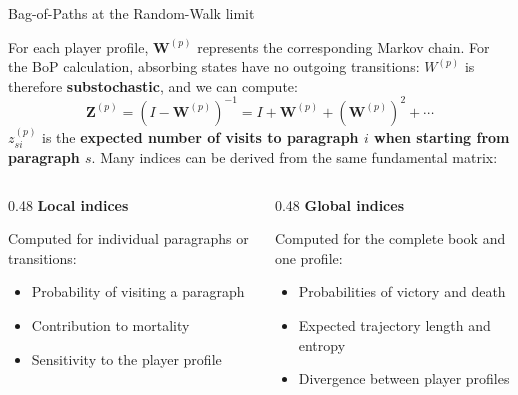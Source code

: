 \documentclass{beamer}
\newcommand{\imp}[1]{\textbf{\color{cyan}#1}}
\begin{document}
	\begin{frame}{Bag-of-Paths at the Random-Walk limit}
		
		\footnotesize
		
		For each player profile, $\mathbf{W}^{(p)}$ represents the corresponding Markov
		chain. For the BoP calculation, absorbing states have no outgoing
		transitions: $W^{(p)}$ is therefore \imp{substochastic}, and we can compute: 
		$$
		\boxed{
			\mathbf{Z}^{(p)}
			=
			\left(I-\mathbf{W}^{(p)}\right)^{-1}
			=
			I+\mathbf{W}^{(p)}+\left(\mathbf{W}^{(p)}\right)^2+\cdots
		}
		$$
		$z^{(p)}_{si}$ is the \imp{expected number of visits to paragraph $i$
		when starting from paragraph $s$}. Many indices can be derived from the same fundamental matrix: 
		
		\vspace{0.2cm}
		
		\begin{columns}[T,onlytextwidth]
			
			\begin{column}{0.48\textwidth}
				\textbf{Local indices}
				
				{\scriptsize
					Computed for individual paragraphs or transitions:
					
					\begin{itemize}
						\item Probability of visiting a paragraph
						\item Contribution to mortality
						\item Sensitivity to the player profile
					\end{itemize}
				}
			\end{column}
			
			\begin{column}{0.48\textwidth}
				\textbf{Global indices}
				
				{\scriptsize
					Computed for the complete book and one profile:
					
					\begin{itemize}
						\item Probabilities of victory and death
						\item Expected trajectory length and entropy
						\item Divergence between player profiles
					\end{itemize}
				}
			\end{column}
			
		\end{columns}
		
	\end{frame}
	
\end{document}
